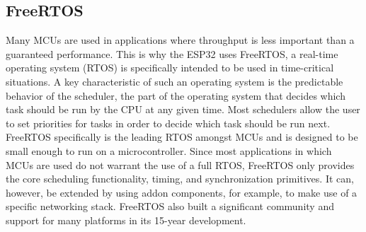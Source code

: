 \subsection{FreeRTOS}
Many MCUs are used in applications where throughput is less important than a guaranteed performance. This is why the ESP32 uses FreeRTOS, a real-time operating system (RTOS) is specifically intended to be used in time-critical situations. A key characteristic of such an operating system is the predictable behavior of the scheduler, the part of the operating system that decides which task should be run by the CPU at any given time. Most schedulers allow the user to set priorities for tasks in order to decide which task should be run next.
FreeRTOS specifically is the leading RTOS amongst MCUs and is designed to be small enough to run on a microcontroller. Since most applications in which MCUs are used do not warrant the use of a full RTOS, FreeRTOS only provides the core scheduling functionality, timing, and synchronization primitives. It can, however, be extended by using addon components, for example, to make use of a specific networking stack. FreeRTOS also built a significant community and support for many platforms in its 15-year development.
